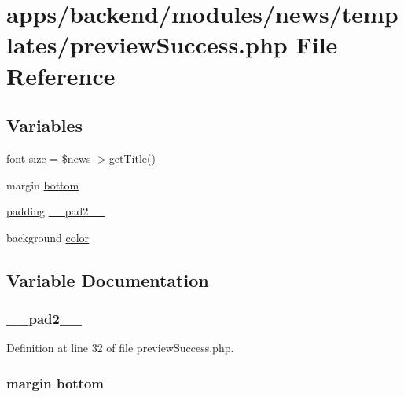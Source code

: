 \hypertarget{preview_success_8php}{\section{apps/backend/modules/news/templates/preview\-Success.php File Reference}
\label{preview_success_8php}
}
\subsection*{Variables}
\begin{DoxyCompactItemize}
\item 
font \hyperlink{preview_success_8php_ae20d3ca2acbfbfe24798ca800435f9f1}{size} = \$news-\/$>$\hyperlink{backend_2modules_2block_2templates_2index_success_8php_a58abfb4a1e6c312e255e475413e1d76d}{get\-Title}()
\item 
margin \hyperlink{preview_success_8php_a9034efd9266ed643f35aa86e8ca32ac2}{bottom}
\item 
\hyperlink{live_2modules_2news_2templates_2__actualitelight_8php_a8b88ec114037db665a2b86d0456baf8e}{padding} \hyperlink{preview_success_8php_a0f9e8e71614b10009e0c99359fe08301}{\-\_\-\-\_\-pad2\-\_\-\-\_\-}
\item 
background \hyperlink{preview_success_8php_ac04e2a463631b69c8f70784275a056d6}{color}
\end{DoxyCompactItemize}


\subsection{Variable Documentation}
\hypertarget{preview_success_8php_a0f9e8e71614b10009e0c99359fe08301}{
\subsubsection[{\-\_\-\-\_\-pad2\-\_\-\-\_\-}]{ \-\_\-\-\_\-pad2\-\_\-\-\_\-}}\label{preview_success_8php_a0f9e8e71614b10009e0c99359fe08301}


Definition at line 32 of file preview\-Success.\-php.

\hypertarget{preview_success_8php_a9034efd9266ed643f35aa86e8ca32ac2}{
\subsubsection[{bottom}]{\setlength{\rightskip}{0pt plus 5cm}margin bottom}}\label{preview_success_8php_a9034efd9266ed643f35aa86e8ca32ac2}


